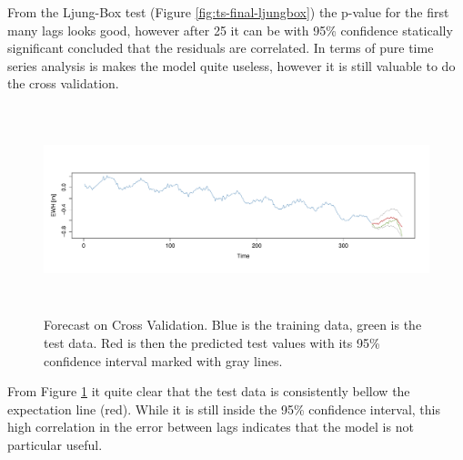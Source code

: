 From the Ljung-Box test (Figure \ref{fig:ts-final-ljungbox}) the p-value for the first many lags looks good, however after 25 it can be with 95\% confidence statically significant concluded that the residuals are correlated. In terms of pure time series analysis is makes the model quite useless, however it is still valuable to do the cross validation.

\begin{figure}[H]
	\centering
	\centerline{\includegraphics[height=6cm]{figures/ts-final-forecast}}
	\caption{Forecast on Cross Validation. Blue is the training data, green is the test data. Red is then the predicted test values with its 95\% confidence interval marked with gray lines.}
	\label{fig:ts-final-forecast}
\end{figure}

From Figure \ref{fig:ts-final-forecast} it quite clear that the test data is consistently bellow the expectation line (red). While it is still inside the 95\% confidence interval, this high correlation in the error between lags indicates that the model is not particular useful. 
